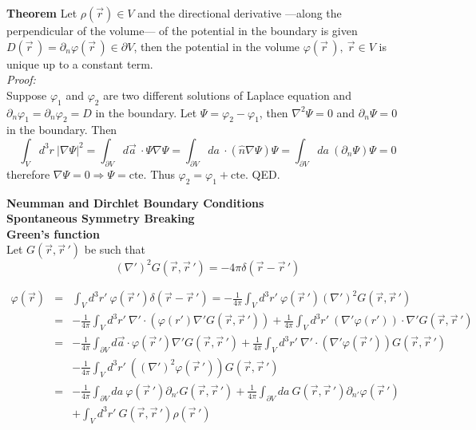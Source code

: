 \documentclass[12pt,a4paper]{article}
\newcommand{\integral}[3]{\int_{#1}^{#2} d #3 \ } %
\begin{document}
\textbf{Theorem} Let $\rho(\vec{r}) \in V$ and the directional derivative ---along the perpendicular of the volume--- of the potential in the boundary is given $D(\vec{r}\,)=\partial_n\varphi(\vec{r} \,) \in \partial V$, then the potential in the volume $\varphi(\vec{r}\,), \  \vec{r} \in  V$ is unique up to a constant term. \\
\textit{Proof: }\\
Suppose $\varphi_1$ and $\varphi_2$ are two different solutions of Laplace equation and $\partial_n\varphi_1 = \partial_n\varphi_2 =D$ in the boundary. Let $\Psi = \varphi_2-\varphi_1$, then $\nabla^2 \Psi = 0$  and  $\partial_n\Psi = 0$ in the boundary. Then
\begin{equation}
	\integral{V}{}{^3r} |\nabla \Psi|^2 = \integral{\partial V}{}{ \vec{a}} \cdot \Psi\nabla \Psi =\integral{\partial V}{}{a} \cdot (\hat{n}\nabla \Psi)\Psi =\integral{\partial V}{}{a} (\partial_n \Psi)\Psi = 0
\end{equation}
therefore $\nabla \Psi = 0 \Rightarrow \Psi = \text{cte.}$  Thus $\varphi_2 = \varphi_1 + \text{cte.}$ QED.

\textbf{Neumman and Dirchlet Boundary Conditions}\\

\textbf{Spontaneous Symmetry Breaking}\\


\textbf{Green's function}\\
Let $G(\vec{r},\vec{r}\,')$ be such that
\begin{equation}
	(\nabla')^2 G(\vec{r},\vec{r}\,') = -4\pi \delta (\vec{r}-\vec{r}\,')
\end{equation}

\begin{eqnarray}
	\varphi(\vec{r}) & = & \integral{V}{}{^3r'}\varphi(\vec{r}\,')\delta(\vec{r}-\vec{r}\,') = -\frac{1}{4\pi}\integral{V}{}{^3r'} \varphi(\vec{r}\,')(\nabla')^2 G(\vec{r},\vec{r}\,')\nonumber\\
	& = & -\frac{1}{4\pi}\integral{V}{}{^3r'} \nabla'\cdot \left( \varphi(r') \nabla' G(\vec{r},\vec{r}\,')\right) + \frac{1}{4\pi}\integral{V}{}{^3r'} (\nabla' \varphi(r'))\cdot \nabla' G(\vec{r},\vec{r}\,') \nonumber\\
	& = & -\frac{1}{4\pi} \int_{\partial V}d\vec{a} \cdot \varphi(\vec{r}\,')\nabla'G(\vec{r},\vec{r}\,') + \frac{1}{4\pi}\integral{V}{}{^3r'}\nabla'\cdot(\nabla'\varphi(\vec{r}\,'))G(\vec{r},\vec{r}\,')\nonumber\\
	& & -\frac{1}{4\pi}\integral{V}{}{^3r'}((\nabla')^2\varphi(\vec{r}\,')) G(\vec{r},\vec{r}\,')\\
	& = & -\frac{1}{4\pi} \integral{\partial V}{}{a}  \varphi(\vec{r}\,')\partial_{n'}G(\vec{r},\vec{r}\,') + \frac{1}{4\pi}\integral{\partial V}{}{a}G(\vec{r},\vec{r}\,')\partial_{n'}\varphi (\vec{r}\,') \\
	& & + \integral{V}{}{^3r'} G(\vec{r},\vec{r}\,') \rho(\vec{r}\,')
\end{eqnarray}
\end{document}
